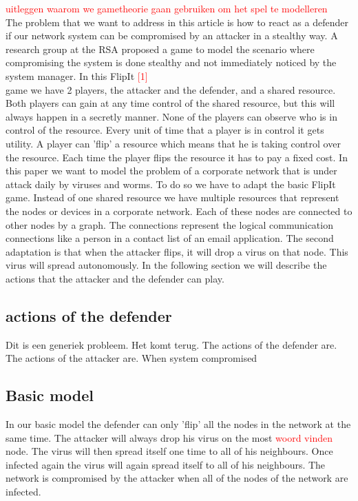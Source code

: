 \documentclass[a4paper, 11pt]{article}
\newcommand{\comment}[1]{\textcolor{red}{#1}\\}
\begin{document}
\comment{uitleggen waarom we gametheorie gaan gebruiken om het spel te modelleren}
 The problem that we want to address in this article is how to react as a defender if our network system can be compromised by an attacker in a stealthy way. A research group at the RSA proposed a game to model the scenario where compromising the system is done stealthy and not immediately noticed by the system manager. In this FlipIt \comment{[1]} game we have 2 players, the attacker and the defender, and a shared resource.
 Both players can gain at any time control of the shared resource, but this will always happen in a secretly manner. None of the players can observe who is in control of the resource. Every unit of time that a player is in control it gets utility. A player can 'flip' a resource which means that he is taking control over the resource. Each time the player flips the resource it has to pay a fixed cost.
 In this paper we want to model the problem of a corporate network that is under attack daily by viruses and worms. To do so we have to adapt the basic FlipIt game. Instead of one shared resource we have multiple resources that represent the nodes or devices in a corporate network. Each of these nodes are connected to other nodes by a graph. The connections represent the logical communication connections like a person in a contact list of an email application. The second adaptation is that when the attacker flips, it will drop a virus on that node. This virus will spread autonomously.
 In the following section we will describe the actions that the attacker and the defender can play.
 
 \subsection{actions of the defender}
 Dit is een generiek probleem. Het komt terug. 
 The actions of the defender are. The actions of the attacker are. When system compromised
 
 \subsection{Basic model}
 In our basic model the defender can only 'flip' all the nodes in the network at the same time. The attacker will always drop his virus on the most \comment{woord vinden} node. The virus will then spread itself one time to all of his neighbours. Once infected again the virus will again spread itself to all of his neighbours. The network is compromised by the attacker when all of the nodes of the network are infected. 
 
\end{document}
